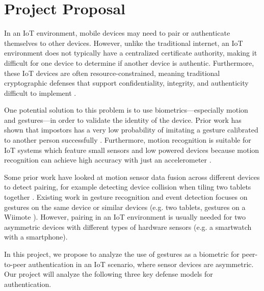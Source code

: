 
\section{Project Proposal}
\label{sec:Proposal}

In an \gls{IoT} environment, mobile devices may need to pair or authenticate themselves to other devices. However, unlike the traditional internet, an \gls{IoT} environment does not typically have a centralized certificate authority, making it difficult for one device to determine if another device is authentic. Furthermore, these \gls{IoT} devices are often resource-constrained, meaning traditional cryptographic defenses that support confidentiality, integrity, and authenticity difficult to implement \cite{cisco:iot-pf,authmodels}.

One potential solution to this problem is to use biometrics---especially motion and gestures---in order to validate the identity of the device. Prior work has shown that impostors has a very low probability of imitating a gesture calibrated to another person successfully \cite{Casanova}. Furthermore, motion recognition is suitable for \gls{IoT} systems which feature small sensors and low powered devices because motion recognition can achieve high accuracy with just an accelerometer \cite{RuizeXu}. 

Some prior work have looked at motion sensor data fusion across different devices to detect pairing, for example detecting device collision when tiling two tablets together \cite{SyncGes}. Existing work in gesture recognition and event detection focuses on gestures on the same device or similar devices (e.g. two tablets, gestures on a Wiimote \cite{LiuuWave}). However, pairing in an \gls{IoT} environment is usually needed for two asymmetric devices with different types of hardware sensors (e.g. a smartwatch with a smartphone).

In this project, we propose to analyze the use of gestures as a biometric for peer-to-peer authentication in an \gls{IoT} scenario, where sensor devices are asymmetric. 
Our project will analyze the following three key defense models for authentication.

